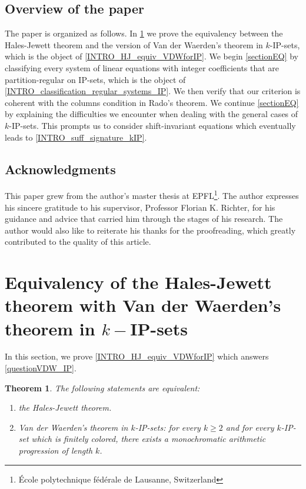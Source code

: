 \documentclass{article}
\theoremstyle{definition}
\theoremstyle{plain}
\newtheorem{theorem}{Theorem}[section]
\theoremstyle{remark}
\begin{document}
\subsection{Overview of the paper}
The paper is organized as follows. In \cref{sectionHJ} we prove the equivalency between the Hales-Jewett theorem and the version of Van der Waerden's theorem in $k$-IP-sets, which is the object of \cref{INTRO_HJ_equiv_VDWforIP}. We begin \cref{sectionEQ} by classifying every system of linear equations with integer coefficients that are partition-regular on IP-sets, which is the object of \cref{INTRO_classification_regular_systems_IP}. We then verify that our criterion is coherent with the columns condition in Rado's theorem. We continue \cref{sectionEQ} by explaining the difficulties we encounter when dealing with the general cases of $k$-IP-sets. This prompts us to consider shift-invariant equations which eventually leads to \cref{INTRO_suff_signature_kIP}. 

\subsection{Acknowledgments}
This paper grew from the author's master thesis at EPFL\footnote{École polytechnique fédérale de Lausanne, Switzerland}. The author expresses his sincere gratitude to his supervisor, Professor Florian K. Richter, for his guidance and advice that carried him through the stages of his research. The author would also like to reiterate his thanks for the proofreading, which greatly contributed to the quality of this article.

\section{Equivalency of the Hales-Jewett theorem with Van der Waerden's theorem in \texorpdfstring{$k-$}-IP-sets}\label{sectionHJ}
In this section, we prove \cref{INTRO_HJ_equiv_VDWforIP} which answers \cref{questionVDW_IP}.

\begin{theorem}\label{HJ_equiv_VDWforIP}
    The following statements are equivalent:
    \begin{enumerate}
        \item the Hales-Jewett theorem.
        \item Van der Waerden's theorem in $k$-IP-sets: for every $k \geq 2$ and for every $k$-IP-set which is finitely colored, there exists a monochromatic arithmetic progression of length $k$.
    \end{enumerate}
\end{theorem}
\end{document}
